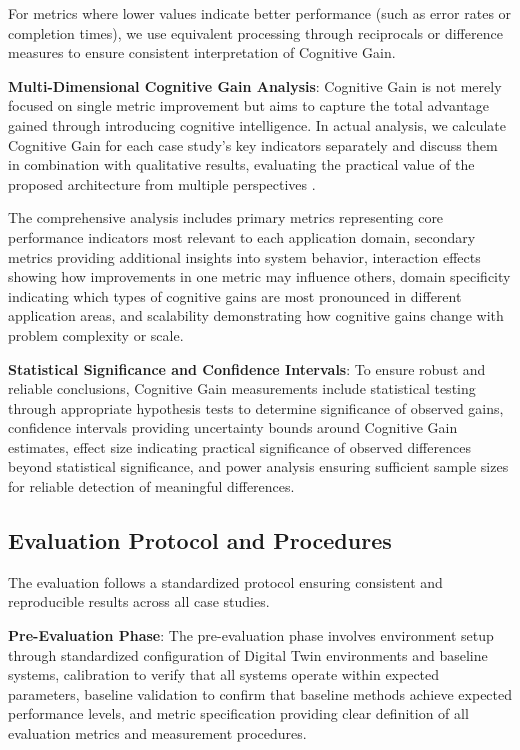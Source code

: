 For metrics where lower values indicate better performance (such as error rates or completion times), we use equivalent processing through reciprocals or difference measures to ensure consistent interpretation of Cognitive Gain.

\textbf{Multi-Dimensional Cognitive Gain Analysis}: Cognitive Gain is not merely focused on single metric improvement but aims to capture the total advantage gained through introducing cognitive intelligence. In actual analysis, we calculate Cognitive Gain for each case study's key indicators separately and discuss them in combination with qualitative results, evaluating the practical value of the proposed architecture from multiple perspectives \cite{hernandez2022measuring}.

The comprehensive analysis includes primary metrics representing core performance indicators most relevant to each application domain, secondary metrics providing additional insights into system behavior, interaction effects showing how improvements in one metric may influence others, domain specificity indicating which types of cognitive gains are most pronounced in different application areas, and scalability demonstrating how cognitive gains change with problem complexity or scale.

\textbf{Statistical Significance and Confidence Intervals}: To ensure robust and reliable conclusions, Cognitive Gain measurements include statistical testing through appropriate hypothesis tests to determine significance of observed gains, confidence intervals providing uncertainty bounds around Cognitive Gain estimates, effect size indicating practical significance of observed differences beyond statistical significance, and power analysis ensuring sufficient sample sizes for reliable detection of meaningful differences.

\subsection{Evaluation Protocol and Procedures}

The evaluation follows a standardized protocol ensuring consistent and reproducible results across all case studies.

\textbf{Pre-Evaluation Phase}: The pre-evaluation phase involves environment setup through standardized configuration of Digital Twin environments and baseline systems, calibration to verify that all systems operate within expected parameters, baseline validation to confirm that baseline methods achieve expected performance levels, and metric specification providing clear definition of all evaluation metrics and measurement procedures.

